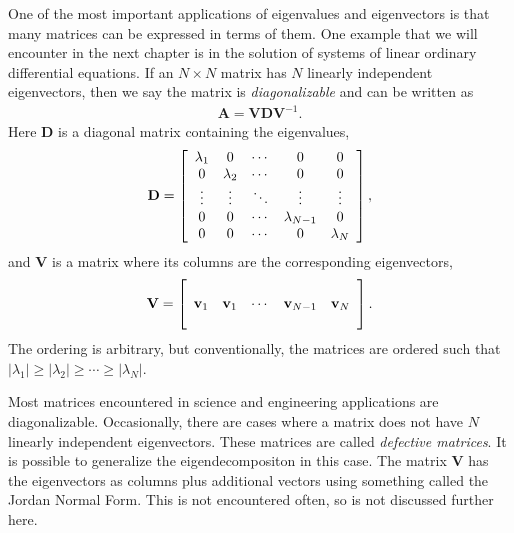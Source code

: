 One of the most important applications of eigenvalues and eigenvectors is that many matrices can be expressed in terms of them. One example that we will encounter in the next chapter is in the solution of systems of linear ordinary differential equations. If an $N \times N$ matrix has $N$ linearly independent eigenvectors, then we say the matrix is \emph{diagonalizable} and can be written as
\begin{align}
  \mathbf{A} = \mathbf{V D V}^{-1} .
\end{align}
Here $\mathbf{D}$ is a diagonal matrix containing the eigenvalues,
\begin{align}
  \mathbf{D} = \left[ \begin{array}{c c c c c}
  \lambda_1		& 0				& \cdots	& 0				& 0				\\
  0				& \lambda_2		& \cdots	& 0 			& 0				\\
  \vdots		& \vdots		& \ddots	& \vdots		& \vdots		\\
  0				& 0				& \cdots	& \lambda_{N-1}	& 0				\\
  0				& 0				& \cdots	& 0				& \lambda_{N} 	\\ \end{array} \right] ,
\end{align}
and $\mathbf{V}$ is a matrix where its columns are the corresponding eigenvectors,
\begin{align}
  \mathbf{V} = \left[ \begin{array}{c c c c c}
  				&				&			&					&					\\
  \mathbf{v}_1	& \mathbf{v}_1	& \cdots	& \mathbf{v}_{N-1}	& \mathbf{v}_N		\\
  				&				&			&					&					\\ \end{array} \right] .
\end{align}
The ordering is arbitrary, but conventionally, the matrices are ordered such that $|\lambda_1| \ge |\lambda_2| \ge \cdots \ge |\lambda_N|$.

Most matrices encountered in science and engineering applications are diagonalizable. Occasionally, there are cases where a matrix does not have $N$ linearly independent eigenvectors. These matrices are called \emph{defective matrices}. It is possible to generalize the eigendecompositon in this case. The matrix $\mathbf{V}$ has the eigenvectors as columns plus additional vectors using something called the Jordan Normal Form. This is not encountered often, so is not discussed further here.


